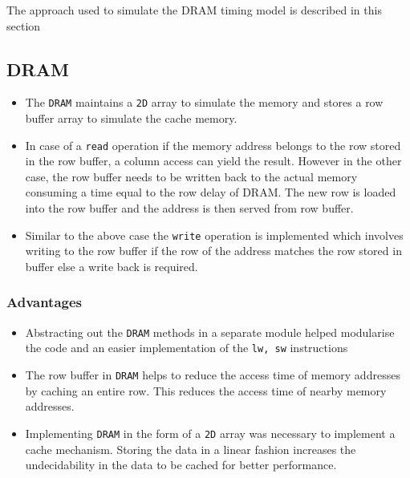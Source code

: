 \documentclass[hidelinks,12pt]{article}
\begin{document}
The approach used to simulate the DRAM timing model is described in this section

\subsection{DRAM}
\begin{itemize}
    \item The \verb|DRAM| maintains a \verb|2D| array to simulate the memory and stores a row buffer array to simulate the cache memory.
    \item In case of a \verb|read| operation if the memory address belongs to the row stored in the row buffer, a column access can yield the result.
          However in the other case, the row buffer needs to be written back to the actual memory consuming a time equal to the row delay of DRAM. The new row is loaded into the row buffer and the address is then served from row buffer.
    \item Similar to the above case the \verb|write| operation is implemented which involves writing to the row buffer if the row of the address matches the row stored in buffer else a write back is required.
\end{itemize}

\subsubsection{Advantages}
\begin{itemize}
    \item Abstracting out the \verb|DRAM| methods in a separate module helped modularise the code and an easier implementation of the \verb|lw, sw| instructions
    \item The row buffer in \verb|DRAM| helps to reduce the access time of memory addresses by caching an entire row. This reduces the access time of nearby memory addresses.
    \item Implementing \verb|DRAM| in the form of a \verb|2D| array was necessary to implement a cache mechanism. Storing the data in a linear fashion increases the undecidability in the data to be cached for better performance.
\end{itemize}
\end{document}
